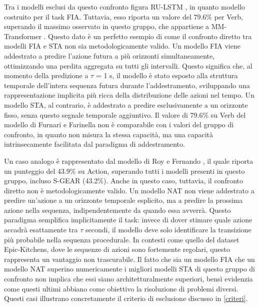 Tra i modelli esclusi da questo confronto figura RU-LSTM \cite{furnari2019would, furnari2020rolling}, in quanto modello costruito per il task FIA. Tuttavia, esso riporta un valore del 79.6\% per Verb, superando il massimo osservato in questo gruppo, che appartiene a MM-Transformer \cite{roy2021action}. Questo dato è un perfetto esempio di come il confronto diretto tra modelli FIA e STA non sia metodologicamente valido. Un modello FIA viene addestrato a predire l'azione futura a più orizzonti simultaneamente, ottimizzando una perdita aggregata su tutti gli intervalli. Questo significa che, al momento della predizione a $\tau$ = 1 s, il modello è stato esposto alla struttura temporale dell'intera sequenza futura durante l'addestramento, sviluppando una rappresentazione implicita più ricca della distribuzione delle azioni nel tempo. Un modello STA, al contrario, è addestrato a predire esclusivamente a un orizzonte fisso, senza questo segnale temporale aggiuntivo. Il valore di 79.6\% su Verb del modello di Furnari e Farinella \cite{furnari2019would, furnari2020rolling} non è comparabile con i valori del gruppo di confronto, in quanto non misura la stessa capacità, ma una capacità intrinsecamente facilitata dal paradigma di addestramento.

Un caso analogo è rappresentato dal modello di Roy e Fernando \cite{roy2022action,roy2024predicting}, il quale riporta un punteggio del 43.9\% su Action, superando tutti i modelli presenti in questo gruppo, incluso S-GEAR \cite{diko2024semantically} (43.2\%). Anche in questo caso, tuttavia, il confronto diretto non è metodologicamente valido. Un modello NAT non viene addestrato a predire un'azione a un orizzonte temporale esplicito, ma a predire la prossima azione nella sequenza, indipendentemente da quando essa avverrà. Questo paradigma semplifica implicitamente il task: invece di dover stimare quale azione accadrà esattamente tra $\tau$ secondi, il modello deve solo identificare la transizione più probabile nella sequenza procedurale. In contesti come quello del dataset Epic-Kitchens, dove le sequenze di azioni sono fortemente regolari, questo rappresenta un vantaggio non trascurabile.
Il fatto che sia un modello FIA che un modello NAT superino numericamente i migliori modelli STA di questo gruppo di confronto non implica che essi siano architetturalmente superiori, bensì evidenzia come questi ultimi abbiano come obiettivo la risoluzione di problemi diversi. Questi casi illustrano concretamente il criterio di esclusione discusso in \ref{criteri}.

